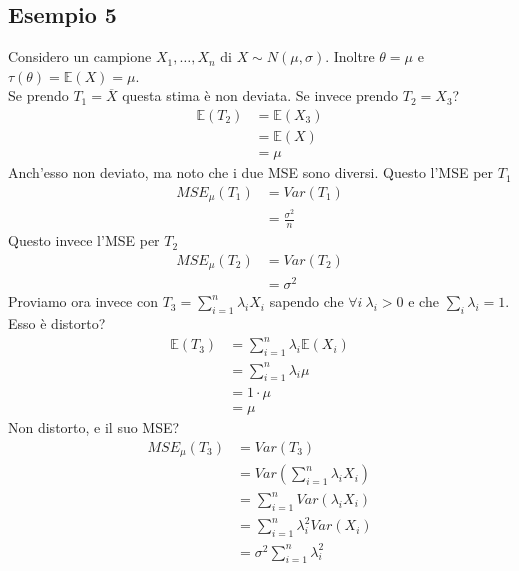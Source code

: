 \documentclass[11pt]{report}
\begin{document}
\subsection{Esempio 5}
Considero un campione $X_1, \dots, X_n$ di $X \sim N(\mu, \sigma)$. Inoltre $\theta = \mu$ e $\tau(\theta) = \mathbb{E}(X) = \mu$.\\
Se prendo $T_1 = \overline{X}$ questa stima è non deviata. Se invece prendo $T_2 = X_3$?
\begin{equation}
	\begin{split}
		\mathbb{E}(T_2) & = \mathbb{E}(X_3)\\
		& = \mathbb{E}(X)\\
		& = \mu
	\end{split}
\end{equation}
Anch'esso non deviato, ma noto che i due MSE sono diversi. Questo l'MSE per $T_1$
\begin{equation}
	\begin{split}
		MSE_\mu(T_1) & = Var(T_1)\\
		& = \frac{\sigma^2}{n}
	\end{split}
\end{equation}
Questo invece l'MSE per $T_2$
\begin{equation}
	\begin{split}
		MSE_\mu(T_2) & = Var(T_2)\\
		& = \sigma^2
	\end{split}
\end{equation}
Proviamo ora invece con $T_3 = \sum_{i=1}^n \lambda_i X_i$ sapendo che $\forall i\ \lambda_i > 0$ e che $\sum_i \lambda_i = 1$. Esso è distorto?
\begin{equation}
	\begin{split}
		\mathbb{E}(T_3) & = \sum_{i=1}^n \lambda_i \mathbb{E}(X_i)\\
		& = \sum_{i=1}^n \lambda_i \mu\\
		& = 1 \cdot \mu\\
		& = \mu
	\end{split}
\end{equation}
Non distorto, e il suo MSE?
\begin{equation}
    \begin{split}
        MSE_\mu(T_3) & = Var(T_3)\\
        & = Var \left( \sum_{i=1}^n \lambda_i X_i \right)\\
        & = \sum_{i=1}^n Var(\lambda_i X_i)\\
        & = \sum_{i=1}^n \lambda_i^2 Var(X_i)\\
        & = \sigma^2 \sum_{i=1}^n \lambda_i^2\\
    \end{split}
\end{equation}
\end{document}
